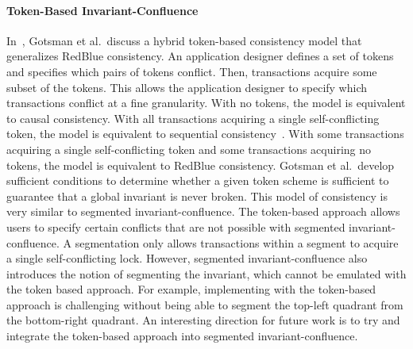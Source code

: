 \paragraph{Token-Based Invariant-Confluence}
In~\cite{gotsman2016cause}, Gotsman et al.\ discuss a hybrid token-based
consistency model that generalizes RedBlue consistency. An application designer
defines a set of tokens and specifies which pairs of tokens conflict. Then,
transactions acquire some subset of the tokens. This allows the application
designer to specify which transactions conflict at a fine granularity. With no
tokens, the model is equivalent to causal consistency. With all transactions
acquiring a single self-conflicting token, the model is equivalent to
sequential consistency~\cite{lamport1979make}. With some transactions acquiring
a single self-conflicting token and some transactions acquiring no tokens, the
model is equivalent to RedBlue consistency. Gotsman et al.\ develop sufficient
conditions to determine whether a given token scheme is sufficient to guarantee
that a global invariant is never broken. This model of consistency is very
similar to segmented invariant-confluence. The token-based approach allows
users to specify certain conflicts that are not possible with segmented
invariant-confluence. A segmentation only allows transactions within a segment
to acquire a single self-conflicting lock. However, segmented
invariant-confluence also introduces the notion of segmenting the invariant,
which cannot be emulated with the token based approach. For example,
implementing  with the token-based approach is
challenging without being able to segment the top-left quadrant from the
bottom-right quadrant. An interesting direction for future work is to try and
integrate the token-based approach into segmented invariant-confluence.

%

